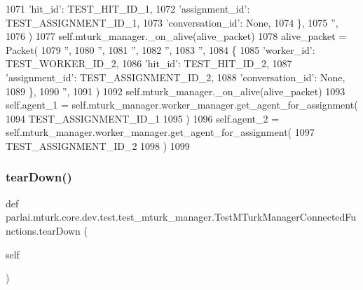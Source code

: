 \begin{DoxyCode}
1071                 \textcolor{stringliteral}{'hit\_id'}: TEST\_HIT\_ID\_1,
1072                 \textcolor{stringliteral}{'assignment\_id'}: TEST\_ASSIGNMENT\_ID\_1,
1073                 \textcolor{stringliteral}{'conversation\_id'}: \textcolor{keywordtype}{None},
1074             \},
1075             \textcolor{stringliteral}{''},
1076         )
1077         self.mturk\_manager.\_on\_alive(alive\_packet)
1078         alive\_packet = Packet(
1079             \textcolor{stringliteral}{''},
1080             \textcolor{stringliteral}{''},
1081             \textcolor{stringliteral}{''},
1082             \textcolor{stringliteral}{''},
1083             \textcolor{stringliteral}{''},
1084             \{
1085                 \textcolor{stringliteral}{'worker\_id'}: TEST\_WORKER\_ID\_2,
1086                 \textcolor{stringliteral}{'hit\_id'}: TEST\_HIT\_ID\_2,
1087                 \textcolor{stringliteral}{'assignment\_id'}: TEST\_ASSIGNMENT\_ID\_2,
1088                 \textcolor{stringliteral}{'conversation\_id'}: \textcolor{keywordtype}{None},
1089             \},
1090             \textcolor{stringliteral}{''},
1091         )
1092         self.mturk\_manager.\_on\_alive(alive\_packet)
1093         self.agent\_1 = self.mturk\_manager.worker\_manager.get\_agent\_for\_assignment(
1094             TEST\_ASSIGNMENT\_ID\_1
1095         )
1096         self.agent\_2 = self.mturk\_manager.worker\_manager.get\_agent\_for\_assignment(
1097             TEST\_ASSIGNMENT\_ID\_2
1098         )
1099 
\end{DoxyCode}
\mbox{\label{classparlai_1_1mturk_1_1core_1_1dev_1_1test_1_1test__mturk__manager_1_1TestMTurkManagerConnectedFunctions_a7528a419b3b3d3b18a4c1c498f46129f}} 
\subsubsection{\texorpdfstring{tear\+Down()}{tearDown()}}
{\footnotesize\ttfamily def parlai.\+mturk.\+core.\+dev.\+test.\+test\+\_\+mturk\+\_\+manager.\+Test\+M\+Turk\+Manager\+Connected\+Functions.\+tear\+Down (\begin{DoxyParamCaption}\item[{}]{self }\end{DoxyParamCaption})}



